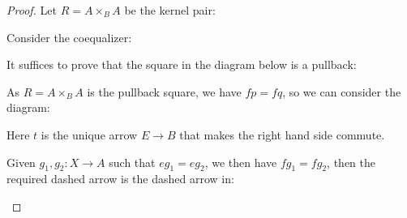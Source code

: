 \documentclass[a4paper]{article}
\DeclareMathOperator{\pr}{\sf pr}
\begin{document}
\begin{proof}
    Let $R=A\times_B A$ be the kernel pair:

    \begin{center}
    \end{center}

    Consider the coequalizer:

    \begin{center}
    \end{center}

    It suffices to prove that the square in the diagram below is a pullback:

    \begin{center}
    \end{center}

    As $R=A\times_B A$ is the pullback square, we have $fp = fq$, so we can consider the diagram:
    
    \begin{center}
    \end{center}

    Here $t$ is the unique arrow $E\to B$ that makes the right hand side commute. 

    Given $g_1,g_2:X\to A$ such that $eg_1 = eg_2$, we then have $fg_1=fg_2$, then the required dashed arrow is the dashed arrow in:

    \begin{center}
    \end{center}
\end{proof}
\end{document}
